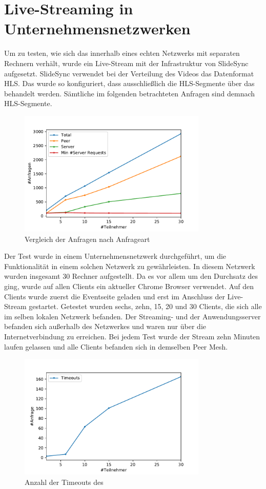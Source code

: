 \section{Live-Streaming in Unternehmensnetzwerken}
Um zu testen, wie sich das \cdn innerhalb eines echten Netzwerks mit separaten Rechnern verhält, wurde ein Live-Stream mit der Infrastruktur von SlideSync aufgesetzt. SlideSync verwendet bei der Verteilung des Videos das Datenformat HLS. Das \cdn wurde so konfiguriert, dass ausschließlich die HLS-Segmente über das \cdn behandelt werden. Sämtliche im folgenden betrachteten Anfragen sind demnach HLS-Segmente. 
\begin{figure}[!h]
	\centering
	\includegraphics[width=0.8\textwidth]{figures/clients_line_chart}
	\caption[A Figure Short-Title]{Vergleich der Anfragen nach Anfrageart}
	\label{fig:live_stream_line_chart}
\end{figure}
Der Test wurde in einem Unternehmensnetzwerk durchgeführt, um die Funktionalität in einem solchen Netzwerk zu gewährleisten. In diesem Netzwerk wurden insgesamt 30 Rechner aufgestellt. Da es vor allem um den Durchsatz des \cdns ging, wurde auf allen Clients ein aktueller Chrome Browser verwendet. Auf den Clients wurde zuerst die Eventseite geladen und erst im Anschluss der Live-Stream gestartet. Getestet wurden sechs, zehn, 15, 20 und 30 Clients, die sich alle im selben lokalen Netzwerk befanden. Der Streaming- und der Anwendungsserver befanden sich außerhalb des Netzwerkes und waren nur über die Internetverbindung zu erreichen. Bei jedem Test wurde der Stream zehn Minuten laufen gelassen und alle Clients befanden sich in demselben Peer Mesh.

\begin{figure}[!h]
	\centering
	\includegraphics[width=0.8\textwidth]{figures/timeouts}
	\caption[A Figure Short-Title]{Anzahl der Timeouts des \cdns}
	\label{fig:timeouts}
\end{figure}


